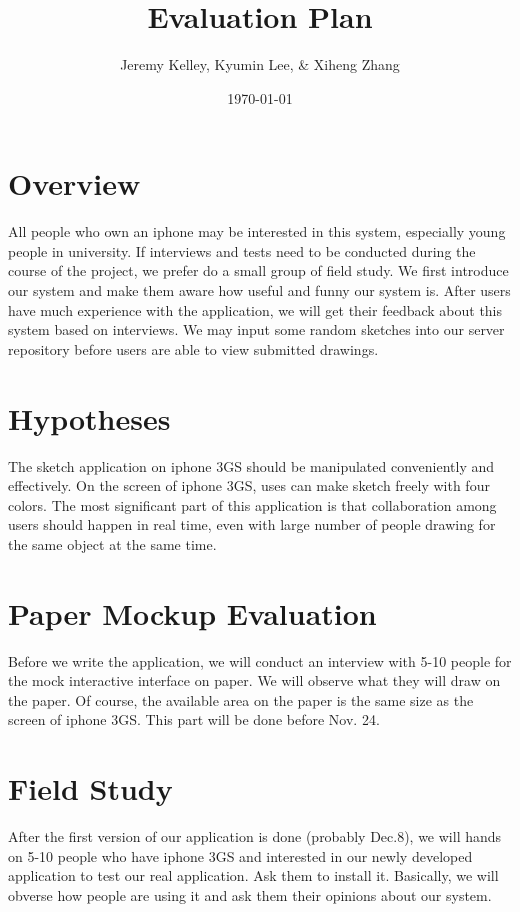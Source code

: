 \documentclass{article}
\begin{document}
\setlength{\parindent}{0pt}
\setlength{\parskip}{.5ex plus 0.5ex minus 0.2ex}




\title{ Evaluation Plan }

\author{ Jeremy Kelley, Kyumin Lee, \& Xiheng Zhang }

\date{\today}

\maketitle

\section{Overview}

All people who own an iphone may be interested in this system, especially young people in university. If interviews and tests need to be conducted during the course of the project, we prefer do a small group of field study. We first introduce our system and make them aware how useful and funny our system is.  After users have much experience with the application, we will get their feedback about this system based on interviews. We may input some random sketches into our server repository before users are able to view submitted drawings.

\section{Hypotheses}
The sketch application on iphone 3GS should be manipulated conveniently and effectively. On the screen of iphone 3GS, uses can make sketch freely with four colors. The most significant part of this application is that collaboration among  users should happen in real time, even with large number of people drawing for the same object at the same time.

\section{Paper Mockup Evaluation}
Before we write the application, we will conduct an interview with 5-10 people for the mock interactive interface on paper. We will observe what they will draw on the paper. Of course, the available area on the paper is the same size as the screen of iphone 3GS. This part will be done before Nov. 24.

\section{Field Study}
After the first version of our application is done (probably Dec.8), we will hands on 5-10 people who have iphone 3GS and interested in our newly developed application to test our real application. Ask them to install it. Basically, we will obverse how people are using it and ask them their opinions about our system.
\end{document}
